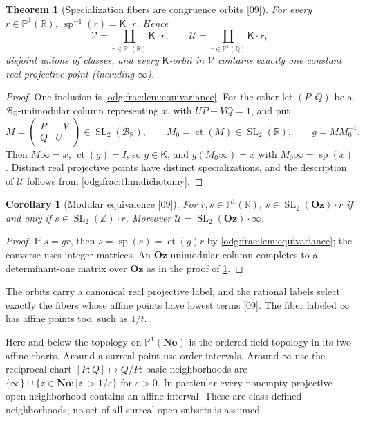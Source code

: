 \documentclass[11pt,oneside]{article}
\numberwithin{equation}{section}
\newtheorem{theorem}{Theorem}[section]
\newtheorem{corollary}[corollary]{Corollary}
\theoremstyle{definition}
\theoremstyle{remark}
\newcommand{\No}{\mathbf{No}}
\newcommand{\Oz}{\mathbf{Oz}}
\newcommand{\Z}{\mathbb Z}
\newcommand{\Q}{\mathbb Q}
\newcommand{\R}{\mathbb R}
\newcommand{\BR}{\mathcal B_{\R}}
\newcommand{\ct}{\operatorname{ct}}
\newcommand{\SL}{\operatorname{SL}}
\newcommand{\src}[1]{\textup{\textsf{\small[#1]}}}
\newcommand{\spz}{\operatorname{sp}}
\newcommand{\Vreg}{\mathcal V}
\newcommand{\Ureg}{\mathcal U}
\newcommand{\Kcong}{\mathsf K}
\begin{document}
\begin{theorem}[Specialization fibers are congruence orbits \src{09}]\label{odg:frac:thm:orbits}
For every $r\in\mathbb P^1(\R)$, $\spz^{-1}(r)=\Kcong\cdot r$. Hence
\[
 \Vreg=\coprod_{r\in\mathbb P^1(\R)}\Kcong\cdot r,\qquad
 \Ureg=\coprod_{r\in\mathbb P^1(\Q)}\Kcong\cdot r,
\]
disjoint unions of classes, and every $\Kcong$-orbit in $\Vreg$ contains exactly
one constant real projective point (including $\infty$).
\end{theorem}
\begin{proof}
One inclusion is \cref{odg:frac:lem:equivariance}. For the other let $(P,Q)$
be a $\BR$-unimodular column representing $x$, with $UP+VQ=1$, and put
\[
 M=\begin{pmatrix}P&-V\\Q&U\end{pmatrix}\in\SL_2(\BR),\qquad
 M_0=\ct(M)\in\SL_2(\R),\qquad g=MM_0^{-1}.
\]
Then $M\infty=x$, $\ct(g)=I$, so $g\in\Kcong$, and $g(M_0\infty)=x$ with
$M_0\infty=\spz(x)$. Distinct real projective points have distinct specializations, and the
description of $\Ureg$ follows from \cref{odg:frac:thm:dichotomy}.
\end{proof}

\begin{corollary}[Modular equivalence \src{09}]\label{odg:frac:cor:modular}
For $r,s\in\mathbb P^1(\R)$, $s\in\SL_2(\Oz)\cdot r$ if and only if
$s\in\SL_2(\Z)\cdot r$. Moreover $\Ureg=\SL_2(\Oz)\cdot\infty$.
\end{corollary}
\begin{proof}
If $s=gr$, then $s=\spz(s)=\ct(g)r$ by \cref{odg:frac:lem:equivariance}; the
converse uses integer matrices. An $\Oz$-unimodular column completes to a
determinant-one matrix over $\Oz$ as in the proof of \cref{odg:frac:thm:orbits}.
\end{proof}

The orbits carry a canonical real projective label, and the rational labels
select exactly the fibers whose affine points have lowest terms \src{09}.
The fiber labeled $\infty$ has affine points too, such as $1/t$.

Here and below the topology on $\mathbb P^1(\No)$ is the ordered-field
topology in its two affine charts. Around a surreal point use order
intervals. Around $\infty$ use the reciprocal chart $[P:Q]\mapsto Q/P$:
basic neighborhoods are $\{\infty\}\cup\{z\in\No:|z|>1/\varepsilon\}$
for $\varepsilon>0$. In particular every nonempty projective open
neighborhood contains an affine interval. These are class-defined
neighborhoods; no set of all surreal open subsets is assumed.
\end{document}
